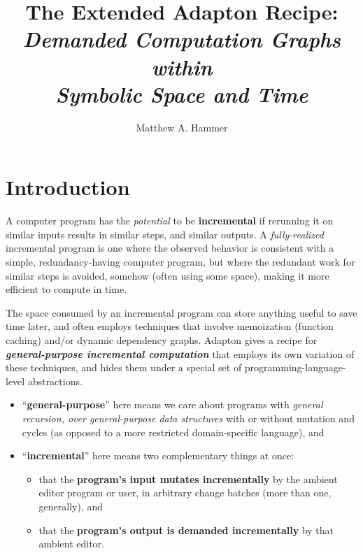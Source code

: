 \documentclass[11pt]{article}
\begin{document}
\author{Matthew A. Hammer}
\title{The Extended Adapton Recipe:
  \\
  \emph{Demanded Computation Graphs\\
  within\\
  Symbolic Space and Time}
}

\maketitle

\linenumbers

\section{Introduction}

A computer program has the \emph{potential} to be \textbf{incremental} if
rerunning it on similar inputs results in similar steps, and similar
outputs.
%
A \emph{fully-realized} incremental program is one where the observed
behavior is consistent with a simple, redundancy-having computer program,
but where the redundant work for similar steps is
avoided, somehow (often using some space), making it more efficient to compute in time.

The space consumed by an incremental program can store anything useful
to save time later, and often employs techniques that involve
memoization (function caching) and/or dynamic dependency graphs.
%
Adapton gives a recipe for \textbf{\emph{general-purpose incremental
  computation}} that employs its own variation of these techniques,
and hides them under a special set of programming-language-level
abstractions.
%
\begin{itemize}
\item ``\textbf{general-purpose}'' here means we care about programs
  with \emph{general recursion, over general-purpose data structures}
  with or without mutation and cycles (as opposed to a more restricted
  domain-specific language), and
  
\item ``\textbf{incremental}'' here means two complementary things at once:
  \begin {itemize}

  \item that the \textbf{program's input mutates incrementally} by the
    ambient editor program or user, in arbitrary change batches (more than one, generally), and 
    
  \item that the \textbf{program's output is demanded incrementally}
    by that ambient editor.
  \end{itemize}
\end{itemize}
\end{document}
